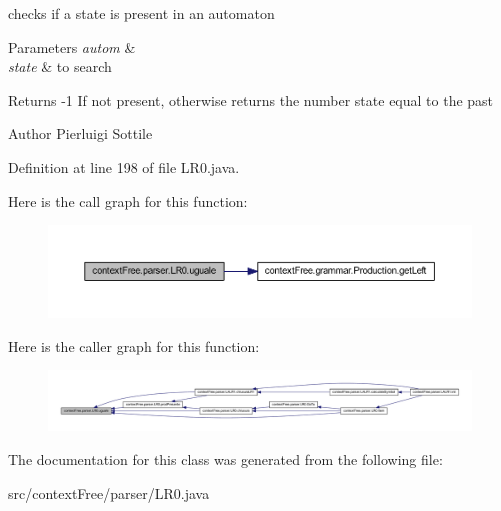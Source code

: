 checks if a state is present in an automaton 


\begin{DoxyParams}{Parameters}
{\em autom} & \\
\hline
{\em state} & to search \\
\hline
\end{DoxyParams}
\begin{DoxyReturn}{Returns}
-\/1 If not present, otherwise returns the number state equal to the past 
\end{DoxyReturn}
\begin{DoxyAuthor}{Author}
Pierluigi Sottile 
\end{DoxyAuthor}


Definition at line 198 of file L\-R0.\-java.



Here is the call graph for this function\-:\nopagebreak
\begin{figure}[H]
\begin{center}
\leavevmode
\includegraphics[width=350pt]{classcontext_free_1_1parser_1_1_l_r0_a8de929e041a5a1a273e6ddd05dc7e0ca_cgraph}
\end{center}
\end{figure}




Here is the caller graph for this function\-:\nopagebreak
\begin{figure}[H]
\begin{center}
\leavevmode
\includegraphics[width=350pt]{classcontext_free_1_1parser_1_1_l_r0_a8de929e041a5a1a273e6ddd05dc7e0ca_icgraph}
\end{center}
\end{figure}




The documentation for this class was generated from the following file\-:\begin{DoxyCompactItemize}
\item 
src/context\-Free/parser/L\-R0.\-java\end{DoxyCompactItemize}
